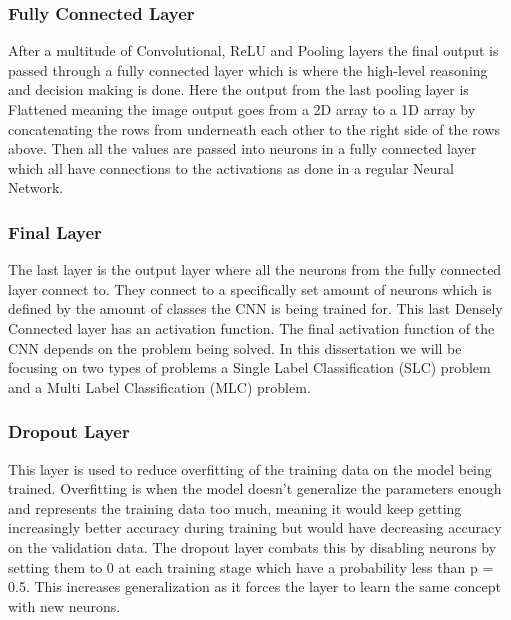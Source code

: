 \documentclass{csfyp}
\begin{document}
\subsubsection{Fully Connected Layer}
After a multitude of Convolutional, ReLU and Pooling layers the final output is passed through a fully connected layer which is where the high-level reasoning and decision making is done. Here the output from the last pooling layer is Flattened meaning the image output goes from a 2D array to a 1D array by concatenating the rows from underneath each other to the right side of the rows above. Then all the values are passed into neurons in a fully connected layer which all have connections to the activations as done in a regular Neural Network. 

\subsubsection{Final Layer}
The last layer is the output layer where all the neurons from the fully connected layer connect to. They connect to a specifically set amount of neurons which is defined by the amount of classes the CNN is being trained for. This last Densely Connected layer has an activation function. The final activation function of the CNN depends on the problem being solved. In this dissertation we will be focusing on two types of problems a Single Label Classification (SLC) problem and a Multi Label Classification (MLC) problem.

\subsubsection{Dropout Layer}
This layer is used to reduce overfitting of the training data on the model being trained. Overfitting is when the model doesn’t generalize the parameters enough and represents the training data too much, meaning it would keep getting increasingly better accuracy during training but would have decreasing accuracy on the validation data. The dropout layer combats this by disabling neurons by setting them to 0 at each training stage which have a probability less than p = 0.5. This increases generalization as it forces the layer to learn the same concept with new neurons.
\end{document}
